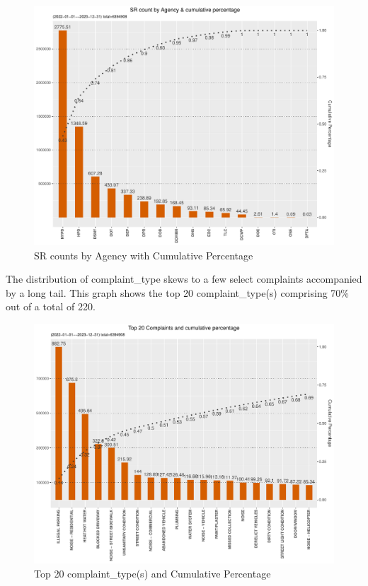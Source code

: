 \documentclass[12pt, titlepage]{article}
\begin{document}
\begin{figure}[tbp]
	\centering
	\includegraphics[width=\textwidth]{SRs_by_Agency.pdf}
  	\caption{SR counts by Agency with Cumulative Percentage}
	\label{fig:SRcountbyAgency}
\end{figure}

The distribution of complaint\_type skews to a few select complaints 
accompanied by a long tail. This graph shows the top 20 complaint\_type(s) 
comprising 70\% out of a total of 220.

\begin{figure}[tbp]
  \centering
 	\includegraphics[width=\textwidth]{SR_by_Complaint_Type.pdf} 
	\caption{Top 20 complaint\_type(s) and Cumulative Percentage} 
	\label{fig:SR_complaints}
\end{figure}
\end{document}
